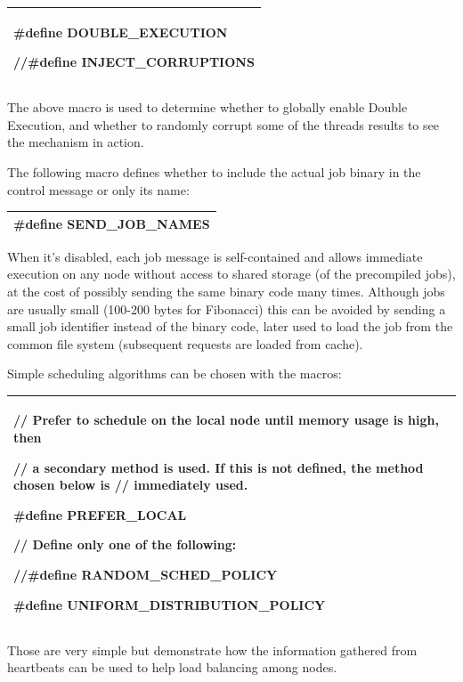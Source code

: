 \documentclass[a4paper]{article}
\begin{document}
\begin{flushleft}
\tablehead{}
\begin{supertabular}{|m{6.29346in}|}
\hline
{\ttfamily \#define DOUBLE\_EXECUTION}

\ttfamily //\#define INJECT\_CORRUPTIONS\\\hline
\end{supertabular}
\end{flushleft}
{
The above macro is used to determine whether to globally enable Double
Execution, and whether to randomly corrupt some of the threads results
to see the mechanism in action.}

{
The following macro defines whether to include the actual job binary in
the control message or only its name: }

\begin{flushleft}
\tablehead{}
\begin{supertabular}{|m{6.29346in}|}
\hline
{}\ttfamily \#define SEND\_JOB\_NAMES\\\hline
\end{supertabular}
\end{flushleft}
{
When it{\textquoteright}s disabled, each job message is self-contained
and allows immediate execution on any node without access to shared
storage (of the precompiled jobs), at the cost of possibly sending the
same binary code many times. Although jobs are usually small (100-200
bytes for Fibonacci) this can be avoided by sending a small job
identifier instead of the binary code, later used to load the job from
the common file system (subsequent requests are loaded from cache).}

{
Simple scheduling algorithms can be chosen with the macros:}

\begin{flushleft}
\tablehead{}
\begin{supertabular}{|m{6.29346in}|}
\hline
{\ttfamily // Prefer to schedule on the local
node until memory usage is high, then}

{\ttfamily // a secondary method is used. If
this is not defined, the method chosen below is // immediately used.}

{\ttfamily \#define PREFER\_LOCAL}

{\ttfamily // Define only one of the following:}

{\ttfamily //\#define RANDOM\_SCHED\_POLICY}

\ttfamily \#define
UNIFORM\_DISTRIBUTION\_POLICY\\\hline
\end{supertabular}
\end{flushleft}
{
Those are very simple but demonstrate how the information gathered from
heartbeats can be used to help load balancing among nodes.}
\end{document}
